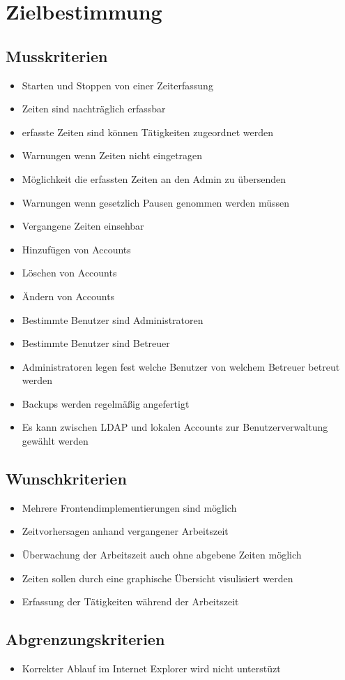 \section{Zielbestimmung}

\subsection{Musskriterien}

\begin{itemize}
	\item Starten und Stoppen von einer Zeiterfassung
	\item Zeiten sind nachträglich erfassbar
	\item erfasste Zeiten sind können Tätigkeiten zugeordnet werden
	\item Warnungen wenn Zeiten nicht eingetragen
	\item Möglichkeit die erfassten Zeiten an den Admin zu übersenden
	\item Warnungen wenn gesetzlich Pausen genommen werden müssen
	\item Vergangene Zeiten einsehbar
	\item Hinzufügen von Accounts
	\item Löschen von Accounts
	\item Ändern von Accounts
	\item Bestimmte Benutzer sind Administratoren
	\item Bestimmte Benutzer sind Betreuer
	\item Administratoren legen fest welche Benutzer von welchem Betreuer betreut werden
	\item Backups werden regelmäßig angefertigt
	\item Es kann zwischen LDAP und lokalen Accounts zur Benutzerverwaltung gewählt werden
\end{itemize}


\subsection{Wunschkriterien}

\begin{itemize}
	\item Mehrere Frontendimplementierungen sind möglich
	\item Zeitvorhersagen anhand vergangener Arbeitszeit
	\item Überwachung der Arbeitszeit auch ohne abgebene Zeiten möglich
	\item Zeiten sollen durch eine graphische Übersicht visulisiert werden
	\item Erfassung der Tätigkeiten während der Arbeitszeit

\end{itemize}


\subsection{Abgrenzungskriterien}
\begin{itemize}
	\item Korrekter Ablauf im Internet Explorer wird nicht unterstüzt
\end{itemize}
